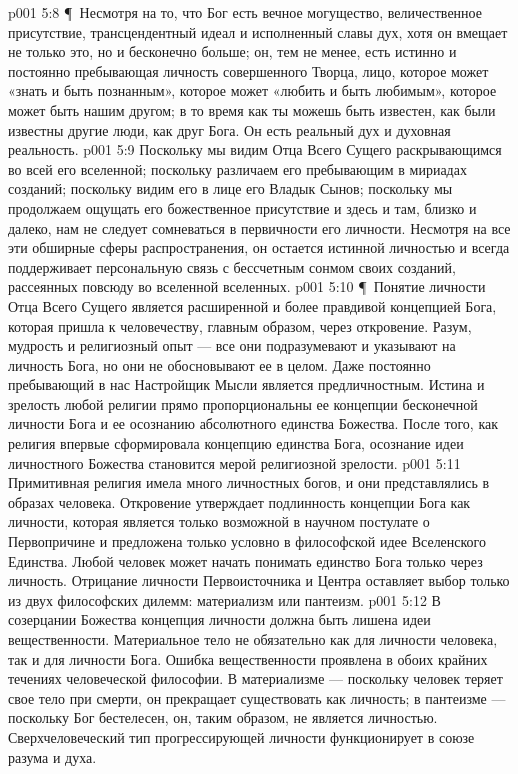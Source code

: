 \vs p001 5:8 \P\ Несмотря на то, что Бог есть вечное могущество, величественное присутствие, трансцендентный идеал и исполненный славы дух, хотя он вмещает не только это, но и бесконечно больше; он, тем не менее, есть истинно и постоянно пребывающая личность совершенного Творца, лицо, которое может «знать и быть познанным», которое может «любить и быть любимым», которое может быть нашим другом; в то время как ты можешь быть известен, как были известны другие люди, как друг Бога. Он есть реальный дух и духовная реальность.
\vs p001 5:9 Поскольку мы видим Отца Всего Сущего раскрывающимся во всей его вселенной; поскольку различаем его пребывающим в мириадах созданий; поскольку видим его в лице его Владык Сынов; поскольку мы продолжаем ощущать его божественное присутствие и здесь и там, близко и далеко, нам не следует сомневаться в первичности его личности. Несмотря на все эти обширные сферы распространения, он остается истинной личностью и всегда поддерживает персональную связь с бессчетным сонмом своих созданий, рассеянных повсюду во вселенной вселенных.
\vs p001 5:10 \P\ Понятие личности Отца Всего Сущего является расширенной и более правдивой концепцией Бога, которая пришла к человечеству, главным образом, через откровение. Разум, мудрость и религиозный опыт --- все они подразумевают и указывают на личность Бога, но они не обосновывают ее в целом. Даже постоянно пребывающий в нас Настройщик Мысли является предличностным. Истина и зрелость любой религии прямо пропорциональны ее концепции бесконечной личности Бога и ее осознанию абсолютного единства Божества. После того, как религия впервые сформировала концепцию единства Бога, осознание идеи личностного Божества становится мерой религиозной зрелости.
\vs p001 5:11 Примитивная религия имела много личностных богов, и они представлялись в образах человека. Откровение утверждает подлинность концепции Бога как личности, которая является только возможной в научном постулате о Первопричине и предложена только условно в философской идее Вселенского Единства. Любой человек может начать понимать единство Бога только через личность. Отрицание личности Первоисточника и Центра оставляет выбор только из двух философских дилемм: материализм или пантеизм.
\vs p001 5:12 В созерцании Божества концепция личности должна быть лишена идеи вещественности. Материальное тело не обязательно как для личности человека, так и для личности Бога. Ошибка вещественности проявлена в обоих крайних течениях человеческой философии. В материализме --- поскольку человек теряет свое тело при смерти, он прекращает существовать как личность; в пантеизме --- поскольку Бог бестелесен, он, таким образом, не является личностью. Сверхчеловеческий тип прогрессирующей личности функционирует в союзе разума и духа.

